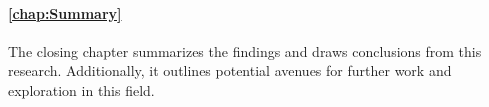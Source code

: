 \paragraph{\autoref{chap:Summary}} %
\label{par:Intro_Structure_Summary}
The closing chapter summarizes the findings and draws conclusions from this
    research.
Additionally, it outlines potential avenues for further work and exploration in
    this field.

